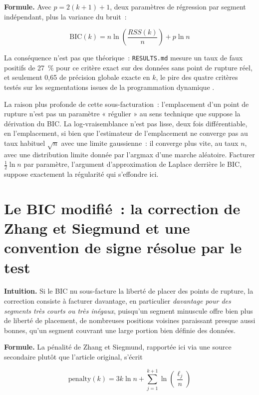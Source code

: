 \documentclass[11pt]{article}
\newcommand{\code}[1]{\texttt{#1}}
\begin{document}
\textbf{Formule.} Avec $p = 2(k+1) + 1$, deux paramètres de régression par
segment indépendant, plus la variance du bruit~:

\begin{equation}
\mathrm{BIC}(k) = n \ln\!\left(\frac{RSS(k)}{n}\right) + p \ln n
\end{equation}

La conséquence n'est pas que théorique~: \code{RESULTS.md} mesure un taux
de faux positifs de 27~\% pour ce critère exact sur des données sans point
de rupture réel, et seulement 0,65 de précision globale exacte en $k$, le
pire des quatre critères testés sur les segmentations issues de la
programmation dynamique \citep{yao1988} \citep{zhangsiegmund2007}.

La raison plus profonde de cette sous-facturation~: l'emplacement d'un
point de rupture n'est pas un paramètre « régulier » au sens technique que
suppose la dérivation du BIC. La log-vraisemblance n'est pas lisse, deux
fois différentiable, en l'emplacement, si bien que l'estimateur de
l'emplacement ne converge pas au taux habituel $\sqrt n$ avec une limite
gaussienne~: il converge plus vite, au taux $n$, avec une distribution
limite donnée par l'argmax d'une marche aléatoire. Facturer
$\frac{1}{2}\ln n$ par paramètre, l'argument d'approximation de Laplace
derrière le BIC, suppose exactement la régularité qui s'effondre ici.

\section{Le BIC modifié~: la correction de Zhang et Siegmund et une convention de signe résolue par le test}

\textbf{Intuition.} Si le BIC nu sous-facture la liberté de placer des
points de rupture, la correction consiste à facturer davantage, en
particulier \emph{davantage pour des segments très courts ou très
inégaux}, puisqu'un segment minuscule offre bien plus de liberté de
placement, de nombreuses positions voisines paraissant presque aussi
bonnes, qu'un segment couvrant une large portion bien définie des données.

\textbf{Formule.} La pénalité de Zhang et Siegmund, rapportée ici via une
source secondaire plutôt que l'article original, s'écrit

\begin{equation}
\text{penalty}(k) = 3k \ln n + \sum_{j=1}^{k+1} \ln\!\left(\frac{\ell_j}{n}\right)
\end{equation}
\end{document}
